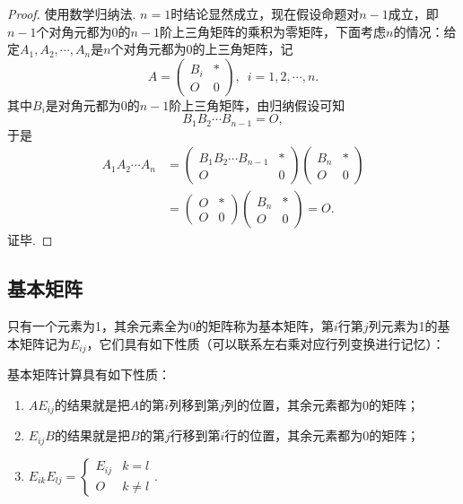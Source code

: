 \begin{proof}
    使用数学归纳法. $n=1$时结论显然成立，现在假设命题对$n-1$成立，即$n-1$个对角元都为0的$n-1$阶上三角矩阵的乘积为零矩阵，下面考虑$n$的情况：给定$A_1,A_2,\cdots,A_n$是$n$个对角元都为0的上三角矩阵，记
    \[A=\begin{pmatrix}
        B_i & * \\ O & 0
    \end{pmatrix},\enspace i=1,2,\cdots,n.\]
    其中$B_i$是对角元都为0的$n-1$阶上三角矩阵，由归纳假设可知
    \[B_1B_2\cdots B_{n-1}=O,\]
    于是
    \begin{align*}
        A_1A_2\cdots A_n&=\begin{pmatrix}
            B_1B_2\cdots B_{n-1} & * \\ O & 0
        \end{pmatrix}\begin{pmatrix}
            B_n & * \\ O & 0
        \end{pmatrix} \\
        &=\begin{pmatrix}
            O & * \\ O & 0
        \end{pmatrix}\begin{pmatrix}
            B_n & * \\ O & 0
        \end{pmatrix}=  O.
    \end{align*}
    证毕.
\end{proof}

\subsection{基本矩阵}

只有一个元素为1，其余元素全为0的矩阵称为基本矩阵，第$i$行第$j$列元素为1的基本矩阵记为$E_{ij}$，它们具有如下性质（可以联系左右乘对应行列变换进行记忆）：
\begin{theorem}
    基本矩阵计算具有如下性质：
    \begin{enumerate}
        \item $AE_{ij}$的结果就是把$A$的第$i$列移到第$j$列的位置，其余元素都为0的矩阵；

        \item $E_{ij}B$的结果就是把$B$的第$j$行移到第$i$行的位置，其余元素都为0的矩阵；

        \item $E_{ik}E_{lj} = \begin{cases}
                      E_{ij} & k = l    \\
                      O      & k \neq l
                  \end{cases}$.
    \end{enumerate}
\end{theorem}

